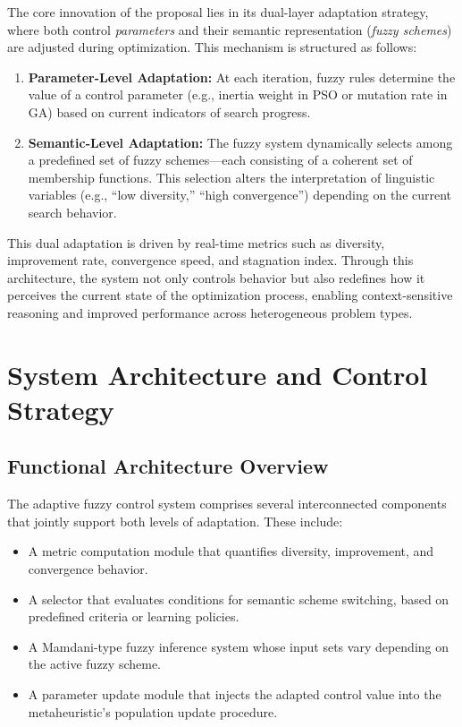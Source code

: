 The core innovation of the proposal lies in its dual-layer adaptation strategy, where both control \textit{parameters} and their semantic representation (\textit{fuzzy schemes}) are adjusted during optimization. This mechanism is structured as follows:

\begin{enumerate}
    \item \textbf{Parameter-Level Adaptation:} At each iteration, fuzzy rules determine the value of a control parameter (e.g., inertia weight in PSO or mutation rate in GA) based on current indicators of search progress.
    
    \item \textbf{Semantic-Level Adaptation:} The fuzzy system dynamically selects among a predefined set of fuzzy schemes—each consisting of a coherent set of membership functions. This selection alters the interpretation of linguistic variables (e.g., “low diversity,” “high convergence”) depending on the current search behavior.
\end{enumerate}

This dual adaptation is driven by real-time metrics such as diversity, improvement rate, convergence speed, and stagnation index. Through this architecture, the system not only controls behavior but also redefines how it perceives the current state of the optimization process, enabling context-sensitive reasoning and improved performance across heterogeneous problem types.

\section{System Architecture and Control Strategy}

\subsection{Functional Architecture Overview}
The adaptive fuzzy control system comprises several interconnected components that jointly support both levels of adaptation. These include:

\begin{itemize}
    \item A metric computation module that quantifies diversity, improvement, and convergence behavior.
    \item A selector that evaluates conditions for semantic scheme switching, based on predefined criteria or learning policies.
    \item A Mamdani-type fuzzy inference system whose input sets vary depending on the active fuzzy scheme.
    \item A parameter update module that injects the adapted control value into the metaheuristic's population update procedure.
\end{itemize}

